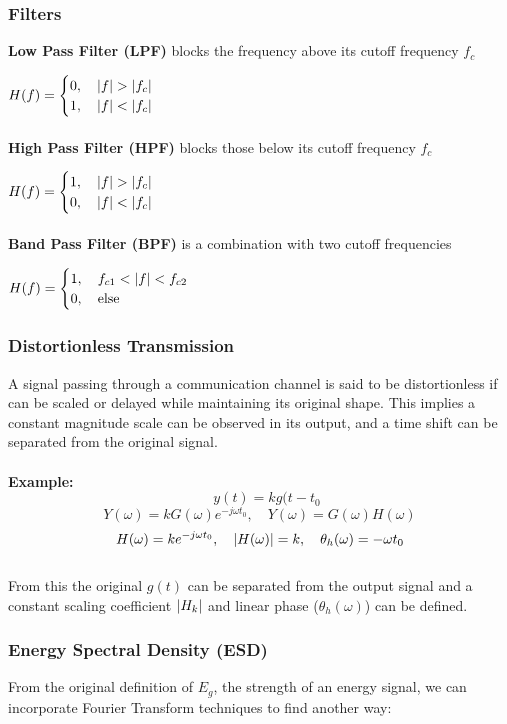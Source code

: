 \documentclass[11pt]{article}
\DeclarePairedDelimiter{\abs}{\lvert}{\rvert}
\begin{document}
\subsubsection{Filters}
\textbf{Low Pass Filter (LPF)} blocks the frequency above its  cutoff frequency $f_c$ \hfill \break
\par \quad 
$H(f) = \begin{cases}
    0, \quad \abs{f} > \abs{f_c} \\
    1, \quad \abs{f} < \abs{f_c}
\end{cases}$ \\ \\ \hfill \break
\textbf{High Pass Filter (HPF)} blocks those below its  cutoff frequency $f_c$ \hfill \break
\par \quad 
$H(f) = \begin{cases}
    1, \quad \abs{f} > \abs{f_c} \\
    0, \quad \abs{f} < \abs{f_c}
\end{cases}$ \\ \\ \hfill \break
\textbf{Band Pass Filter (BPF)} is a combination with two cutoff frequencies \hfill \break
\par \quad 
$H(f) = \begin{cases}
    1, \quad f_{c1} < \abs{f} < f_{c2} \\
    0, \quad \text{else}
\end{cases}$
\subsubsection{Distortionless Transmission}
A signal passing through a communication channel is said to be distortionless if can be scaled or delayed while maintaining its original shape. This implies a constant magnitude scale can be observed in its output, and a time shift can be separated from the original signal. \\ \\
\textbf{Example:} $$\quad y(t) = kg(t - t_0$$
$$Y(\omega) = kG(\omega)e^{-j\omega t_0}, \quad Y(\omega) = G(\omega)H(\omega)$$
$$H(\omega) = ke^{-j\omega t_0}, \quad \abs{H(\omega)} = k, \quad \theta_h(\omega) = -\omega t_0$$
\\
From this the original $g(t)$ can be separated from the output signal and a constant scaling coefficient $\abs{H_k}$ and linear phase ($\theta_h(\omega)$) can be defined.
\subsubsection{Energy Spectral Density (ESD)}
From the original definition of $E_g$, the strength of an energy signal, we can incorporate Fourier Transform techniques to find another way:
\end{document}
